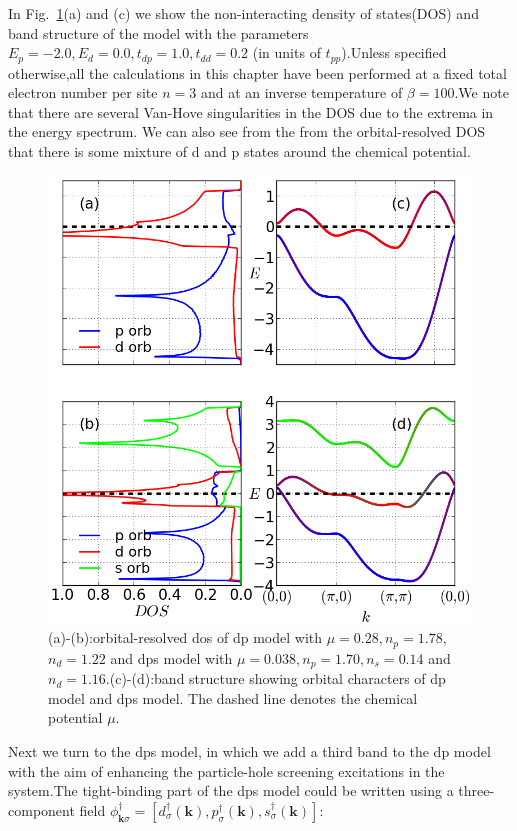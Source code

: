 \documentclass[10pt]{ruthesis}
\begin{document}
{In Fig.~\ref{fig1}(a) and (c) we show the non-interacting density of states(DOS) and band structure of the model with the parameters $E_p=-2.0,E_d=0.0,t_{dp}=1.0,t_{dd}=0.2$ (in units of $t_{pp}$).Unless specified otherwise,all the calculations in this chapter have been performed at a fixed  total electron number per site $n=3$ and at an inverse temperature of $\beta=100$.We note that there are several Van-Hove singularities in the DOS due to the extrema in the energy spectrum. We can also see from the from the orbital-resolved DOS that there is some mixture of d and p states around the chemical potential.
\begin{figure}[H]
\begin{center}
 \includegraphics[width=0.9\columnwidth]{./plotForpublishing/pd+dps_band_struc}
 \caption{\label{fig1}(a)-(b):orbital-resolved dos of dp model with $\mu=0.28,n_p=1.78,$  $n_d=1.22$ and dps model with $\mu=0.038,n_p=1.70,n_s=0.14$ and $n_d=1.16$.(c)-(d):band structure showing orbital characters of dp model and dps model. The dashed line denotes the chemical potential $\mu$.}
\end{center}
\end{figure}

Next we turn to the dps model, in which we add a third band to the dp model with the aim of enhancing the particle-hole screening excitations in the system.The tight-binding part of the dps model could be written  using a three-component field  $\phi^\dagger_{\mathbf k\sigma}=[d^\dagger_\sigma(\mathbf k),p^\dagger_\sigma(\mathbf k),s^\dagger_\sigma(\mathbf k)]$:
 
}
\end{document}

